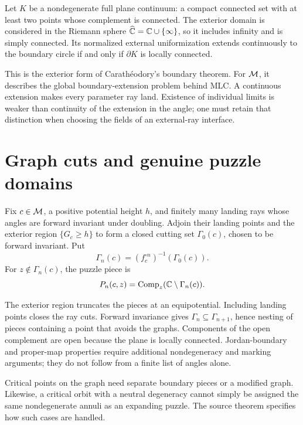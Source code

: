 \begin{theorem}
Let $K$ be a nondegenerate full plane continuum: a compact connected
set with at least two points whose complement is connected.
The exterior domain is considered in the Riemann sphere
$\widehat{\mathbb C}=\mathbb C\cup\{\infty\}$, so it includes infinity and is simply
connected.  Its normalized external uniformization extends
continuously to the boundary circle if and only if $\partial K$
is locally connected.
\end{theorem}

This is the exterior form of Carathéodory's boundary theorem.
For $\mathcal M$, it describes the global boundary-extension problem behind
MLC.  A continuous extension makes every parameter ray land.
Existence of individual limits is weaker than continuity of the
extension in the angle; one must retain that distinction when choosing
the fields of an external-ray interface.

\section{Graph cuts and genuine puzzle domains}

\begin{definition}
\label{def:puzzle-piece}
Fix $c\in\mathcal M$, a positive potential height $h$, and finitely many
landing rays whose angles are forward invariant under doubling.
Adjoin their landing points and the exterior region $\{G_c\ge h\}$
to form a closed cutting set $\Gamma_0(c)$, chosen to be forward
invariant.  Put
\[
 \Gamma_n(c)=(f_c^{\circ n})^{-1}(\Gamma_0(c)).
\]
For $z\notin\Gamma_n(c)$, the puzzle piece is
\[
 P_n(c,z)=\operatorname{Comp}_z(\mathbb C\setminus\Gamma_n(c)).
\]
\end{definition}

The exterior region truncates the pieces at an equipotential.  Including
landing points closes the ray cuts.  Forward invariance gives
$\Gamma_n\subseteq\Gamma_{n+1}$, hence nesting of pieces containing
a point that avoids the graphs.  Components of the open complement
are open because the plane is locally connected.
Jordan-boundary and proper-map properties require additional
nondegeneracy and marking arguments; they do not follow from a finite
list of angles alone.

Critical points on the graph need separate boundary pieces or a
modified graph.  Likewise, a critical orbit with a neutral degeneracy
cannot simply be assigned the same nondegenerate annuli as an
expanding puzzle.  The source theorem specifies how such cases are
handled.

